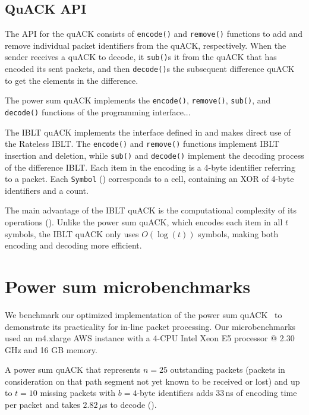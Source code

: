 \subsection{QuACK API}



The API for the quACK consists of \texttt{encode()} and \texttt{remove()}
functions to add and remove individual packet identifiers from the quACK,
respectively. When the sender receives a quACK to decode, it \texttt{sub()}s
it from the quACK that has encoded its sent packets, and then \texttt{decode()}s
the subsequent difference quACK to get the elements in the difference.

The power sum quACK implements the \texttt{encode()}, \texttt{remove()},
\texttt{sub()}, and \texttt{decode()} functions of the programming interface...

The IBLT quACK implements
the interface defined in  and makes direct use of the Rateless IBLT.
The \texttt{encode()} and \texttt{remove()} functions implement IBLT insertion
and deletion, while \texttt{sub()} and \texttt{decode()} implement
the decoding process of the difference IBLT.
Each item in the encoding is a 4-byte identifier referring to a packet.
Each \texttt{Symbol} () corresponds to a
cell, containing an XOR of 4-byte identifiers and a count.

The main advantage of the IBLT quACK is the computational complexity of its
operations (). Unlike the power sum quACK,
which encodes each item in all $t$ symbols, the IBLT quACK only uses
$O(\log(t))$ symbols, making both encoding and decoding more efficient.

\section{Power sum microbenchmarks}
\label{sec:quack:psum-microbenchmarks}



We benchmark our optimized implementation of the power sum quACK~\cite{quack-github}
to demonstrate its practicality for in-line packet processing.
Our microbenchmarks used an m4.xlarge AWS instance with a 4-CPU Intel Xeon E5
processor @ 2.30 GHz and 16 GB memory.



A power sum quACK that represents $n=25$ outstanding packets
(packets in consideration on that path segment not yet known to be received or lost)
and up to $t=10$ missing
packets with $b=4$-byte identifiers adds $33$\,ns of encoding time per
packet and takes $2.82$\,$\mu$s to decode ().

